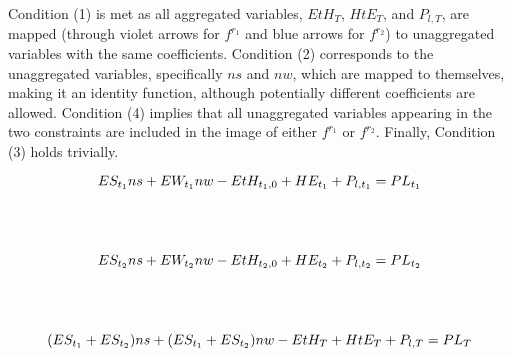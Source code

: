 {{\begin{example}
  Condition (1) is met as all aggregated variables, \(EtH_T\), \(HtE_T\), and \(P_{l,T}\), 
  are mapped (through violet arrows for \(f^{r_1}\) and blue arrows for \(f^{r_2}\)) to unaggregated variables with the same coefficients. 
  Condition (2) corresponds to the unaggregated variables, specifically \(ns\) and \(nw\), 
  which are mapped to themselves, making it an identity function, although potentially different coefficients are allowed. 
  Condition (4) implies that all unaggregated variables appearing in the two constraints are included in the image of either \(f^{r_1}\) or \(f^{r_2}\). 
  Finally, Condition (3) holds trivially.
\newline
\[
\begin{tikzpicture}
  [place/.style={circle,thick},
  transition/.style={rectangle,draw=black!50,fill=black!20,thick}]

\node (t1) at (0, 2) {$ES_{t_1}ns + EW_{t_1}nw - EtH_{t_1,0} + HE_{t_1} + P_{l,t_1} = PL_{t_1}$};
\node[circle, minimum size=0.6cm] (nst1) at (-2.6, 2) {};
\node[place] (nwt1) at (-1.2, 2) {};
\node[place] (EtHt1) at (-0.1,  2) {};
\node[place] (HtEt1) at (1.1,  2) {};
\node[circle, minimum size=0.6cm] (Pt1) at (2,  2) {};


\node (t2) at (0, 0) {$ES_{t_2}ns + EW_{t_2}nw - EtH_{t_2,0} + HE_{t_2} + P_{l,t_2} = PL_{t_2}$};
\node[circle, minimum size=0.6cm] (nst2) at (-2.6, 0) {};
\node[place] (nwt2) at (-1.2, 0) {};
\node[place] (EtHt2) at (-0.1,  0) {}; 
\node[place] (HtEt2) at (1.1,  0) {};
\node[circle, minimum size=0.6cm] (Pt2) at (2,  0) {};
\node (T) at (0, -2) {$(ES_{t_1} + ES_{t_2})ns + (ES_{t_1} + ES_{t_2})nw - EtH_{T} + HtE_{T} + P_{l,T} = PL_{T}$};
\node[place] (nstT) at (-2.4, -2) {};
\node[circle, minimum size=0.6cm] (nwtT) at (0.2, -2) {};
\node[circle, minimum size=0.6cm] (EtHtT) at (1.2, -2) {};
\node[place] (HtEtT) at (2.2, -2) {};
\node[place] (PtT) at (3.3, -2) {};


\end{tikzpicture}\]
\end{example}}}
